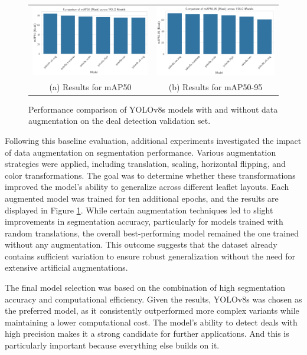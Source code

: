 \documentclass[11pt]{article}
\begin{document}
\begin{figure}[h!]
    \centering
    \begin{tabular}{cc}
    \includegraphics[width=0.5\linewidth]{figures/deal_detection/map50_yolo8.png} &   \includegraphics[width=0.5\linewidth]{figures/deal_detection/map50_95_yolo8.png} \\
    (a) Results for mAP50 & (b) Results for mAP50-95 \\[2pt]
    \end{tabular}
    \caption{Performance comparison of YOLOv8s models with and without data augmentation on the deal detection validation set.}
    \label{fig:yolo8_results}
\end{figure}

Following this baseline evaluation, additional experiments investigated the impact of data augmentation on segmentation performance. Various augmentation strategies were applied, including translation, scaling, horizontal flipping, and color transformations. The goal was to determine whether these transformations improved the model’s ability to generalize across different leaflet layouts. Each augmented model was trained for ten additional epochs, and the results are displayed in Figure \ref{fig:yolo8_results}. While certain augmentation techniques led to slight improvements in segmentation accuracy, particularly for models trained with random translations, the overall best-performing model remained the one trained without any augmentation. This outcome suggests that the dataset already contains sufficient variation to ensure robust generalization without the need for extensive artificial augmentations.

The final model selection was based on the combination of high segmentation accuracy and computational efficiency. Given the results, YOLOv8s was chosen as the preferred model, as it consistently outperformed more complex variants while maintaining a lower computational cost. The model’s ability to detect deals with high precision makes it a strong candidate for further applications. And this is particularly important because everything else builds on it.
\end{document}

